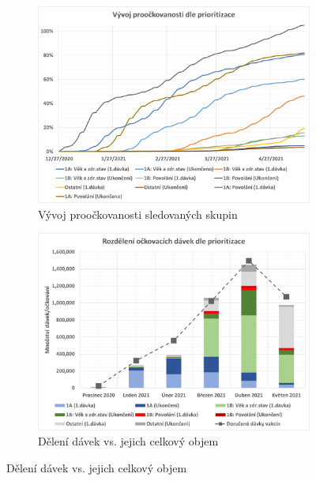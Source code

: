 \begin{figure}
\centering

\begin{subfigure}{0.45\textwidth}
\includegraphics[width=\textwidth]{assets/gr_proockovanost}
\caption{Vývoj proočkovanosti sledovaných skupin}
\label{gr_proockovanost}
\end{subfigure}
%
\begin{subfigure}{0.45\textwidth}
\includegraphics[width=\textwidth]{assets/gr_mesice}
\caption{Dělení dávek vs. jejich celkový objem}
\label{gr_skupiny_davky}
\end{subfigure}



\end{figure}

